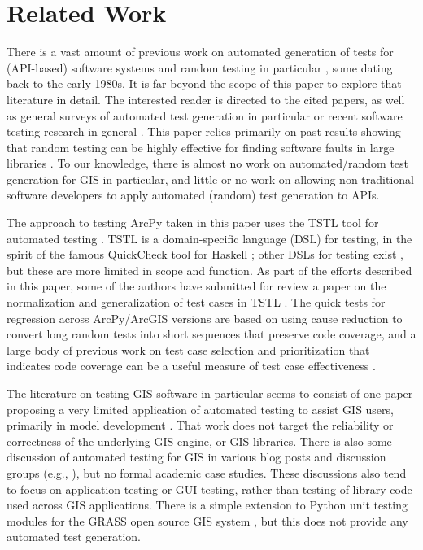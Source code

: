 \section{Related Work}

There is a vast amount of previous work on automated generation of
tests for (API-based) software systems
\cite{Pacheco,FA11,GodefroidKS05} and random testing in particular
\cite{ICSEDiff,Pacheco,AMFL11,ARTChen,ISSTAART,FASE,HamletOnly,Hamlet94,ClaessenH00,CiupaLOM07,RandFormal,WODA08,andrews-etal-rute-rt,ASE08,evalrand,csmith},
some dating back to the early 1980s. It is far beyond the scope of
this paper to explore that literature in detail.  The interested
reader is directed to the cited papers, as well as general surveys of
automated test generation in particular \cite{anand2013orchestrated}
or recent software testing research in general \cite{orsofuse}.  This paper relies primarily on past
results showing that random testing \cite{Hamlet94,Fuzz} can be highly effective for
finding software faults in large libraries
\cite{Pacheco,ICSEDiff,RandFormal,CFV08,AMAI}.  To our knowledge, there is almost
no work on automated/random test generation for GIS in particular, and
little or no work on allowing non-traditional software developers to apply
automated (random) test generation to APIs.

The approach to testing ArcPy taken in this paper uses the TSTL tool
for automated testing \cite{NFM15,ISSTA15,tstl}.  TSTL is a
domain-specific language (DSL) \cite{Fow10} for testing, in the spirit
of the famous QuickCheck tool for Haskell \cite{ClaessenH00}; other
DSLs for testing exist \cite{UDITA}, but these are more limited in
scope and function.  As part of the efforts described in this paper,
some of the authors have submitted for review a paper on the
normalization and generalization of test cases in TSTL
\cite{ICSTnorm}.  The quick tests for regression across ArcPy/ArcGIS
versions are based on using cause reduction
\cite{icst2014,stvrcausereduce} to convert long random tests into
short sequences that preserve code coverage, and a large body of
previous work on test case selection and prioritization that indicates
code coverage \cite{ISSTA13,ICSE14Cov} can be a useful measure of test
case effectiveness
\cite{SelectTest,YooHarman,Graves:2001:ESR:367008.367020}.

The literature on testing GIS software in particular seems to consist
of one paper proposing a very limited application of automated testing
to assist GIS users, primarily in model development \cite{GISTest}.
That work does not target the reliability or correctness of the
underlying GIS engine, or GIS libraries.  There is also some
discussion of automated testing for GIS in various blog posts and
discussion groups (e.g., \cite{gisblog1,gisblog2}), but no formal
academic case studies.  These discussions also tend to focus on
application testing or GUI testing, rather than testing of library
code used across GIS applications.  There is a simple extension to
Python unit testing modules for the GRASS open source GIS system
\cite{GRASSunit}, but this does not provide any automated test generation.

